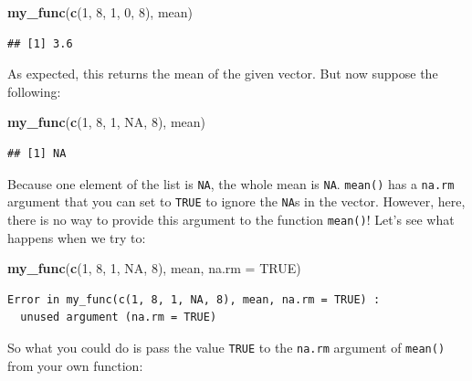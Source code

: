 \documentclass[]{gitbook}
\newenvironment{Shaded}{\begin{snugshade}}{\end{snugshade}}
\newcommand{\DataTypeTok}[1]{\textcolor[rgb]{0.13,0.29,0.53}{#1}}
\newcommand{\DecValTok}[1]{\textcolor[rgb]{0.00,0.00,0.81}{#1}}
\newcommand{\KeywordTok}[1]{\textcolor[rgb]{0.13,0.29,0.53}{\textbf{#1}}}
\newcommand{\NormalTok}[1]{#1}
\newcommand{\OtherTok}[1]{\textcolor[rgb]{0.56,0.35,0.01}{#1}}
\begin{document}
\begin{Shaded}
\begin{Highlighting}[]
\KeywordTok{my_func}\NormalTok{(}\KeywordTok{c}\NormalTok{(}\DecValTok{1}\NormalTok{, }\DecValTok{8}\NormalTok{, }\DecValTok{1}\NormalTok{, }\DecValTok{0}\NormalTok{, }\DecValTok{8}\NormalTok{), mean)}
\end{Highlighting}
\end{Shaded}

\begin{verbatim}
## [1] 3.6
\end{verbatim}

As expected, this returns the mean of the given vector. But now suppose the following:

\begin{Shaded}
\begin{Highlighting}[]
\KeywordTok{my_func}\NormalTok{(}\KeywordTok{c}\NormalTok{(}\DecValTok{1}\NormalTok{, }\DecValTok{8}\NormalTok{, }\DecValTok{1}\NormalTok{, }\OtherTok{NA}\NormalTok{, }\DecValTok{8}\NormalTok{), mean)}
\end{Highlighting}
\end{Shaded}

\begin{verbatim}
## [1] NA
\end{verbatim}

Because one element of the list is \texttt{NA}, the whole mean is \texttt{NA}. \texttt{mean()} has a \texttt{na.rm} argument
that you can set to \texttt{TRUE} to ignore the \texttt{NA}s in the vector. However, here, there is no way to
provide this argument to the function \texttt{mean()}! Let's see what happens when we try to:

\begin{Shaded}
\begin{Highlighting}[]
\KeywordTok{my_func}\NormalTok{(}\KeywordTok{c}\NormalTok{(}\DecValTok{1}\NormalTok{, }\DecValTok{8}\NormalTok{, }\DecValTok{1}\NormalTok{, }\OtherTok{NA}\NormalTok{, }\DecValTok{8}\NormalTok{), mean, }\DataTypeTok{na.rm =} \OtherTok{TRUE}\NormalTok{)}
\end{Highlighting}
\end{Shaded}

\begin{verbatim}
Error in my_func(c(1, 8, 1, NA, 8), mean, na.rm = TRUE) :
  unused argument (na.rm = TRUE)
\end{verbatim}

So what you could do is pass the value \texttt{TRUE} to the \texttt{na.rm} argument of \texttt{mean()} from your own
function:
\end{document}

